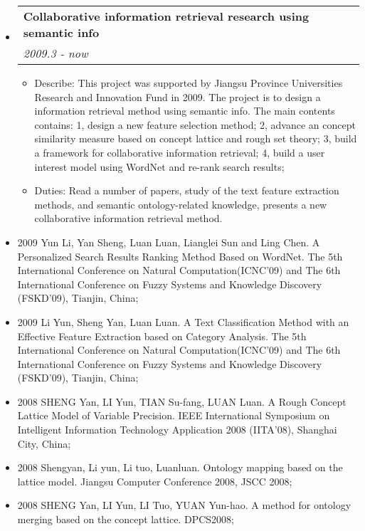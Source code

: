 \documentclass[letterpaper,11pt]{article}
\makeatletter
\newcommand{\resitem}[1]{\item #1 \vspace{-2pt}}
\newcommand{\resheading}[1]{{\large \parashade[.9]{sharpcorners}{\textbf{#1 \vphantom{p\^{E}}}}}}
\newcommand{\ressubheading}[4]{
\begin{tabular*}{6.5in}{l@{\extracolsep{\fill}}r}
        \textbf{#1} & #2 \\
        \textit{#3} & \textit{#4} \\
\end{tabular*}\vspace{-2pt}}
\makeatother
\begin{document}
\begin{itemize}
\item
    \ressubheading{Collaborative information retrieval research using semantic info}{}{2009.3 - now}{}
    \begin{itemize}
        \resitem{   Describe: This project was supported by Jiangsu Province Universities Research and Innovation Fund in 2009. The project is to design a information retrieval method using semantic info. The main contents contains: 1, design a new feature selection method; 2, advance an concept similarity measure based on concept lattice and rough set theory; 3, build a framework for collaborative information retrieval; 4, build a user interest model using WordNet and re-rank search results;}
        \resitem{   Duties: Read a number of papers, study of the text feature extraction methods, and semantic ontology-related knowledge, presents a new collaborative information retrieval method.}
    \end{itemize}
\end{itemize}

\resheading{Papers}
\begin{itemize}
\item{2009 }
Yun Li, Yan Sheng, Luan Luan, Lianglei Sun and Ling Chen. A
Personalized Search Results Ranking Method Based on WordNet. The 5th
International Conference on Natural Computation(ICNC'09) and The 6th
International Conference on Fuzzy Systems and  Knowledge Discovery
(FSKD'09), Tianjin, China;

\item{2009 }
Li Yun, Sheng Yan, Luan Luan. A Text Classification Method with an
Effective Feature Extraction based on Category Analysis. The 5th
International Conference on Natural Computation(ICNC'09) and The 6th
International Conference on Fuzzy Systems and Knowledge Discovery
(FSKD'09), Tianjin, China;

\item{2008 }
SHENG Yan, LI Yun, TIAN Su-fang, LUAN Luan. A Rough Concept Lattice
Model of Variable Precision. IEEE International Symposium on
Intelligent Information Technology Application 2008 (IITA'08),
Shanghai City, China;

\item{2008 }
Shengyan, Li yun, Li tuo, Luanluan. Ontology mapping based on the lattice model. Jiangsu Computer Conference 2008, JSCC 2008;

\item{2008 }
SHENG Yan, LI Yun, LI Tuo, YUAN Yun-hao. A method for ontology merging based on the concept lattice. DPCS2008;

\end{itemize}
\end{document}
